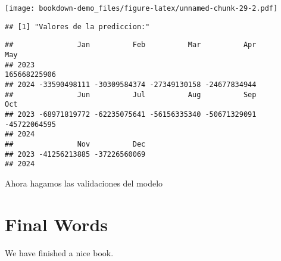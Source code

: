 \documentclass[
]{book}
\begin{document}
\texttt{[image: bookdown-demo\_files/figure-latex/unnamed-chunk-29-2.pdf]}

\begin{verbatim}
## [1] "Valores de la prediccion:"
\end{verbatim}

\begin{verbatim}
##               Jan          Feb          Mar          Apr          May
## 2023                                                     165668225906
## 2024 -33590498111 -30309584374 -27349130158 -24677834944             
##               Jun          Jul          Aug          Sep          Oct
## 2023 -68971819772 -62235075641 -56156335340 -50671329091 -45722064595
## 2024                                                                 
##               Nov          Dec
## 2023 -41256213885 -37226560069
## 2024
\end{verbatim}

Ahora hagamos las validaciones del modelo

\hypertarget{final-words}{%
\chapter{Final Words}\label{final-words}}

We have finished a nice book.

  
\end{document}
